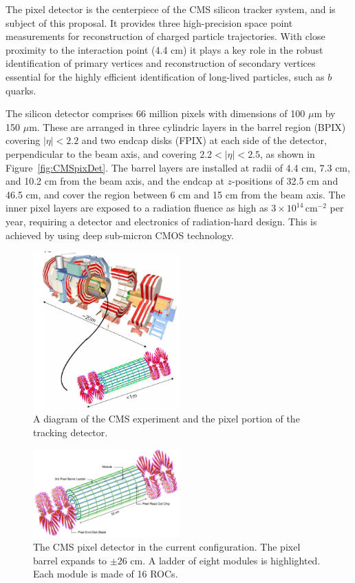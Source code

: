 The pixel detector is the centerpiece of the CMS silicon tracker system, and is subject of this proposal.
It provides three high-precision space point measurements for reconstruction of charged particle trajectories. 
With close proximity to the interaction point (4.4 cm) it plays a key role in the robust identification of 
primary vertices and reconstruction of secondary vertices essential for the highly efficient identification 
of long-lived particles, such as $b$ quarks. 
 
The silicon detector comprises 66 million pixels with dimensions of 100 $\mu$m by 150 $\mu$m.
These are arranged in three cylindric layers in the barrel region (BPIX) covering $|\eta| < 2.2$ 
and two endcap disks (FPIX)  at each side of the detector, perpendicular 
to the beam axis, and covering $2.2 < |\eta| < 2.5$, as shown in Figure~\ref{fig:CMSpixDet}.
The barrel layers are installed at radii of 4.4 cm, 7.3 cm, and 10.2 cm from 
the beam axis, and the endcap at $z$-positions of 32.5 cm and 46.5 cm, and cover the region 
between 6 cm and 15 cm from the beam axis. 
The inner pixel layers are exposed to a radiation fluence as high as $3\times 10^{14} \,\mathrm{cm}^{-2} $ 
per year, requiring a detector and electronics of radiation-hard design. 
This is achieved by using deep sub-micron CMOS technology.


\begin{figure}[htb]
  \centering
  \includegraphics[width=0.5\textwidth]{CMS_detector_low_res.png}
  \caption{\label{fig:cms}
    A diagram of the CMS experiment and the pixel portion of the
    tracking detector.
  }
\end{figure}

\begin{figure}[htb]
  \centering
  \includegraphics[width=0.5\textwidth]{CMSpixDet2.pdf}
  \caption{\label{fig:cms}
  The CMS pixel detector in the current configuration. The pixel
barrel expands to $\pm26$ cm. A ladder of eight modules is highlighted. Each
module is made of 16 ROCs. 
  }
\end{figure}


